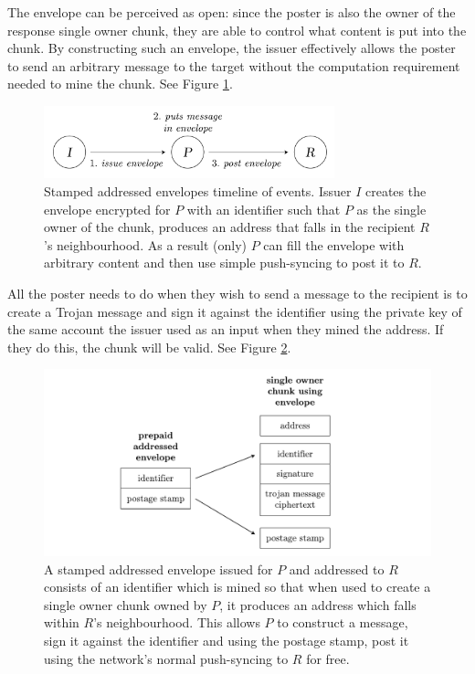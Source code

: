 The envelope can be perceived as open: since the poster is also the owner of the response single owner chunk, they are able to control what content is put into the chunk. By constructing such an envelope, the issuer effectively allows the poster to send an arbitrary message to the target without the computation requirement needed to mine the chunk. See Figure \ref{fig:addressed-envelope-events}. 


\begin{figure}[htbp]
   \centering
   \includegraphics[width=0.75\textwidth]{fig/prepaid-addressed-envelopes-events.pdf}
   \caption[Stamped addressed envelopes timeline of events \statusgreen]{Stamped addressed envelopes timeline of events. Issuer $I$ creates the envelope encrypted for $P$ with an identifier such that $P$ as the single owner of the chunk, produces an address that falls in the recipient $R$'s neighbourhood. As a result (only) $P$ can fill the envelope with arbitrary content and then use simple push-syncing to post it to $R$.}
   \label{fig:addressed-envelope-events}
\end{figure}

All the poster needs to do when they wish to send a message to the recipient is to create a Trojan message and sign it against the identifier using the private key of the same account the issuer used as an input when they mined the address. If they do this, the chunk will be valid. See Figure \ref{fig:addressed-envelope}.


\begin{figure}[htbp]
   \centering
   \includegraphics[width=\textwidth]{fig/addressed-envelope.pdf}
   \caption[Stamped addressed envelopes \statusgreen]{A stamped addressed envelope issued for $P$ and addressed to $R$ consists of an identifier which is mined so that when used to create a single owner chunk owned by $P$, it produces an address which falls within $R$'s neighbourhood. This allows $P$ to construct a message, sign it against the identifier and using the postage stamp, post it using the network's normal push-syncing to $R$ for free. }
   \label{fig:addressed-envelope}
\end{figure}

